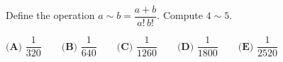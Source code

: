 Define the operation $a\sim b=\dfrac{a+b}{a!\,b!}$. Compute $4\sim5$.

$\textbf{(A) }\dfrac1{320}\qquad\textbf{(B) }\dfrac1{640}\qquad\textbf{(C) }\dfrac1{1260}\qquad\textbf{(D) }\dfrac1{1800}\qquad\textbf{(E) }\dfrac1{2520}$
